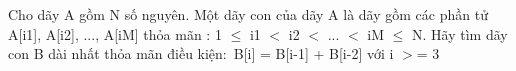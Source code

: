 Cho dãy A gồm N số nguyên. Một dãy con của dãy A là dãy gồm các phần tử A[i1], A[i2], ..., A[iM] thỏa mãn : 1  $\le$  i1 $<$ i2 $<$ ... $<$ iM  $\le$  N. Hãy tìm dãy con B dài nhất thỏa mãn điều kiện: B[i] = B[i-1] + B[i-2] với i $>$= 3